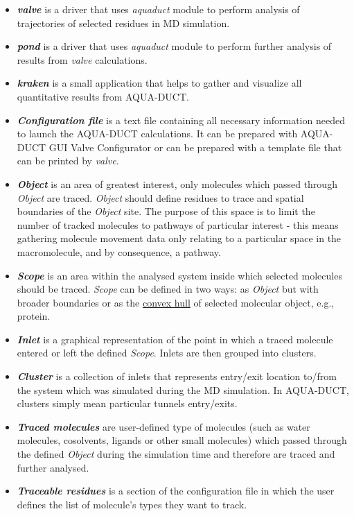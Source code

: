 \documentclass[9pt,tutorial]{livecoms}
\begin{document}
\begin{itemize}
\item \textbf{\textit{valve}} is a driver that uses \textit{aquaduct} module to perform analysis of trajectories of selected residues in MD simulation.
\item \textbf{\textit{pond}} is a driver that uses \textit{aquaduct} module to perform further analysis of results from \textit{valve} calculations.
\item \textbf{\textit{kraken}} is a small application that helps to gather and visualize all quantitative results from AQUA-DUCT.
\item \textbf{\textit{Configuration file}} is a text file containing all necessary information needed to launch the AQUA-DUCT calculations. It can be prepared with AQUA-DUCT GUI Valve Configurator or can be prepared with a template file that can be printed by \textit{valve}.
\item \textbf{\textit{Object}} is an area of greatest interest, only molecules which passed through \textit{Object} are traced. \textit{Object} should define residues to trace and spatial boundaries of the \textit{Object} site. The purpose of this space is to limit the number of tracked molecules to pathways of particular interest - this means gathering molecule movement data only relating to a particular space in the macromolecule, and by consequence, a pathway.
\item \textbf{\textit{Scope}} is an area within the analysed system inside which selected molecules should be traced. \textit{Scope} can be defined in two ways: as \textit{Object} but with broader boundaries or as the \href{https://tunneling-group.github.io/aqua-duct/valve/valve_manual.html?highlight=convex\%20hull#convex-hulls-of-macromolecule-atoms}{convex hull} of selected molecular object, e.g., protein.
\item \textbf{\textit{Inlet}} is a graphical representation of the point in which a traced molecule entered or left the defined \textit{Scope}. Inlets are then grouped into clusters.
\item \textbf{\textit{Cluster}} is a collection of inlets that represents entry/exit location to/from the system which was simulated during the MD simulation. In AQUA-DUCT, clusters simply mean particular tunnels entry/exits.
\item \textbf{\textit{Traced molecules}} are user-defined type of molecules (such as water molecules, cosolvents, ligands or other small molecules) which passed through the defined \textit{Object} during the simulation time and therefore are traced and further analysed.
\item \textbf{\textit{Traceable residues}} is a section of the configuration file in which the user defines the list of molecule's types they want to track. 


\end{itemize}
\end{document}

